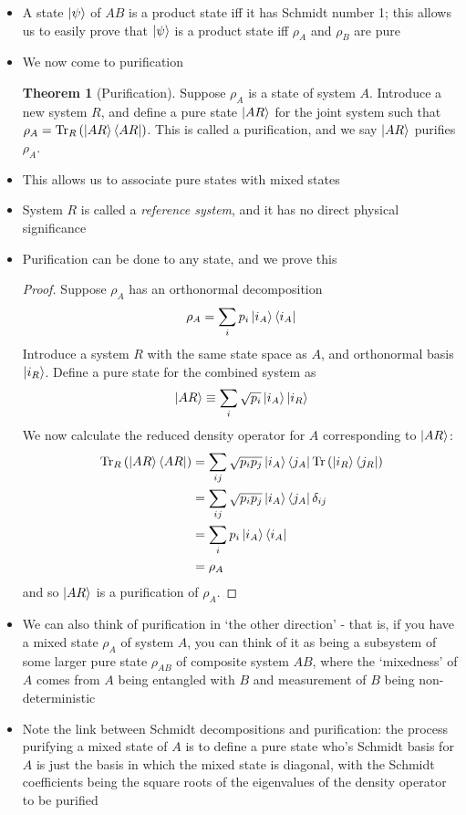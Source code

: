 \documentclass[12pt,a4paper]{article}
\numberwithin{equation}{section}
\newcommand{\ketbra}[2]{\ket{#1}\bra{#2}}
\newcommand{\ketbras}[1]{\ketbra{#1}{#1}}
\theoremstyle{definition}
\theoremstyle{theorem}
\newtheorem{theorem}{Theorem}[section]
\theoremstyle{example}
\begin{document}
\begin{itemize}
		\item A state $\ket{\psi}$ of $AB$ is a product state iff it has Schmidt number 1; this allows us to easily prove that $\ket{\psi}$ is a product state iff $\rho_{A}$ and $\rho_{B}$ are pure
		\item We now come to purification
		\begin{theorem}[Purification]
			Suppose $\rho_{A}$ is a state of system $A$. Introduce a new system $R$, and define a pure state $\ket{AR}$ for the joint system such that $\rho_{A}=\text{Tr}_{R}\left(\ketbras{AR}\right)$. This is called a purification, and we say $\ket{AR}$ purifies $\rho_{A}$.
		\end{theorem}
		\item This allows us to associate pure states with mixed states
		\item System $R$ is called a \textit{reference system}, and it has no direct physical significance
		\item Purification can be done to any state, and we prove this
		\begin{proof}
			Suppose $\rho_{A}$ has an orthonormal decomposition
			\begin{equation}
				\rho_{A}=\sum_{i}p_{i}\ketbras{i_{A}}
			\end{equation}
			Introduce a system $R$ with the same state space as $A$, and orthonormal basis $\ket{i_{R}}$. Define a pure state for the combined system as
			\begin{equation}
				\ket{AR}\equiv\sum_{i}\sqrt{p_{i}}\ket{i_{A}}\ket{i_{R}}
			\end{equation}
			We now calculate the reduced density operator for $A$ corresponding to $\ket{AR}$:
			\begin{equation}
				\begin{aligned}
					\text{Tr}_{R}\left(\ketbras{AR}\right)&=\sum_{ij}\sqrt{p_{i}p_{j}}\ketbra{i_{A}}{j_{A}}\text{Tr}\left(\ketbra{i_{R}}{j_{R}}\right)\\&=\sum_{ij}\sqrt{p_{i}p_{j}}\ketbra{i_{A}}{j_{A}}\delta_{ij}\\
					&=\sum_{i}p_{i}\ketbras{i_{A}}\\&=\rho_{A}
				\end{aligned}
			\end{equation}
			and so $\ket{AR}$ is a purification of $\rho_{A}$.
		\end{proof}
		\item We can also think of purification in `the other direction' - that is, if you have a mixed state $\rho_{A}$ of system $A$, you can think of it as being a subsystem of some larger pure state $\rho_{AB}$ of composite system $AB$, where the `mixedness' of $A$ comes from $A$ being entangled with $B$ and measurement of $B$ being non-deterministic
		\item Note the link between Schmidt decompositions and purification: the process purifying a mixed state of $A$ is to define a pure state who's Schmidt basis for $A$ is just the basis in which the mixed state is diagonal, with the Schmidt coefficients being the square roots of the eigenvalues of the density operator to be purified
	\end{itemize}
\end{document}
